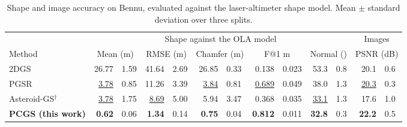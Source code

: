 \begin{table}[t]
\centering
\caption{Shape and image accuracy on Bennu, evaluated against the laser-altimeter shape model. Mean $\pm$ standard deviation over three splits.}
\label{tab:bennu}
\footnotesize
\setlength{\tabcolsep}{2.4pt}
\begin{tabular}{@{}lr@{\,$\pm$\,}lr@{\,$\pm$\,}lr@{\,$\pm$\,}lr@{\,$\pm$\,}lr@{\,$\pm$\,}lr@{\,$\pm$\,}l@{}}
\toprule
 & \multicolumn{10}{c}{Shape against the OLA model} & \multicolumn{2}{c}{Images} \\
\cmidrule(lr){2-11}\cmidrule(lr){12-13}
Method & \multicolumn{2}{c}{Mean (m)} & \multicolumn{2}{c}{RMSE (m)} & \multicolumn{2}{c}{Chamfer (m)} & \multicolumn{2}{c}{F@1 m} & \multicolumn{2}{c}{Normal (\textdegree{})} & \multicolumn{2}{c}{PSNR (dB)} \\
\midrule
2DGS & 26.77 & 1.59 & 41.64 & 2.69 & 26.85 & 0.33 & 0.138 & 0.023 & 53.3 & 0.8 & 20.1 & 0.6 \\
PGSR & \underline{3.78} & 0.85 & 11.26 & 3.39 & \underline{3.84} & 0.81 & \underline{0.689} & 0.049 & 38.0 & 1.3 & \underline{20.3} & 0.3 \\
Asteroid-GS$^{\dagger}$ & \underline{3.78} & 1.75 & \underline{8.69} & 5.00 & 5.94 & 3.47 & 0.368 & 0.035 & \underline{33.1} & 1.3 & 17.6 & 1.0 \\
\textbf{PCGS (this work)} & \textbf{0.62} & 0.06 & \textbf{1.34} & 0.14 & \textbf{0.75} & 0.04 & \textbf{0.812} & 0.011 & \textbf{32.8} & 0.3 & \textbf{22.2} & 0.5 \\
\bottomrule
\end{tabular}
\end{table}
